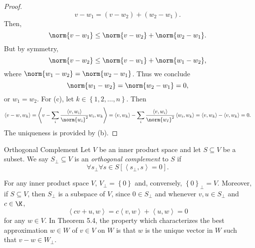 \documentclass[linearalgebraII]{subfiles}
\begin{document}
\begin{proof}
        \begin{equation*}
            v-w_1 = \left( v-w_2 \right) + \left( w_2-w_1 \right) .
        \end{equation*}
        Then,
        \begin{equation*}
            \norm{v-w_1} \leq \norm{v-w_2} + \norm{w_2-w_1}.
        \end{equation*}
        But by symmetry,
        \begin{equation*}
            \norm{v-w_2} \leq \norm{v-w_1} + \norm{w_1-w_2},
        \end{equation*}
        where $\norm{w_1-w_2} = \norm{w_2-w_1}$. Thus we conclude
        \begin{equation*}
            \norm{w_1-w_2} = \norm{w_2-w_1} = 0,
        \end{equation*}
        or $w_1=w_2$. For (c), let $k\in \left\lbrace 1,2,\ldots,n \right\rbrace$. Then
        \begin{equation*}
            \left\langle v-w, w_k\right\rangle = \left\langle v-\sum^{}_{i} \frac{\left\langle v, w_i\right\rangle }{\norm{w_i}^2}w_i, w_k\right\rangle = \left\langle v, w_k\right\rangle - \sum^{}_{i} \frac{\left\langle v, w_i\right\rangle }{\norm{w_I}^2}\left\langle w_i, w_k\right\rangle = \left\langle v, w_k\right\rangle - \left\langle v, w_k\right\rangle = 0.
        \end{equation*}
        The uniqueness is provided by (b).
    \end{proof}

    \begin{definition}{Orthogonal Complement}{}
        Let $V$ be an inner product space and let $S\subseteq V$ be a subset. We say $S_\perp\subseteq V$ is an \emph{orthogonal complement} to $S$ if
        \begin{equation*}
            \forall s_\perp\forall s\in S \left[ \left\langle s_\perp, s\right\rangle =0 \right] .
        \end{equation*}
    \end{definition}

    \begin{remark}
        For any inner product space $V$, $V_\perp = \left\lbrace 0 \right\rbrace$ and, conversely, $\left\lbrace 0 \right\rbrace _\perp = V$. Moreover, if $S\subseteq V$, then $S_\perp$ is a subspace of $V$, since $0\in S_\perp$ and whenever $v,u\in S_\perp$ and $c\in\K$,
        \begin{equation*}
            \left\langle cv+u, w\right\rangle = c\left\langle v, w\right\rangle + \left\langle u, w\right\rangle = 0
        \end{equation*}
        for any $w\in V$. In Theorem 5.4, the property which characterizes the best approximation $w\in W$ of $v\in V$ on $W$ is that $w$ is the unique vector in $W$ such that $v-w\in W_\perp$.
    \end{remark}
\end{document}

